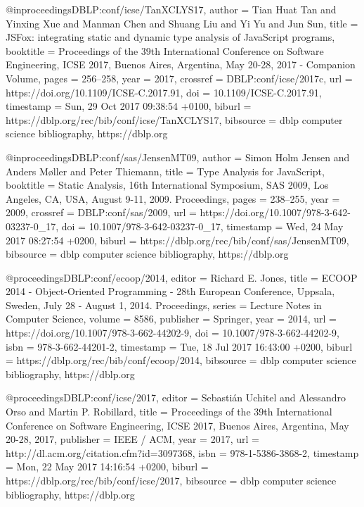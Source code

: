 @inproceedings{DBLP:conf/icse/TanXCLYS17,
  author    = {Tian Huat Tan and
               Yinxing Xue and
               Manman Chen and
               Shuang Liu and
               Yi Yu and
               Jun Sun},
  title     = {JSFox: integrating static and dynamic type analysis of JavaScript
               programs},
  booktitle = {Proceedings of the 39th International Conference on Software Engineering,
               {ICSE} 2017, Buenos Aires, Argentina, May 20-28, 2017 - Companion
               Volume},
  pages     = {256--258},
  year      = {2017},
  crossref  = {DBLP:conf/icse/2017c},
  url       = {https://doi.org/10.1109/ICSE-C.2017.91},
  doi       = {10.1109/ICSE-C.2017.91},
  timestamp = {Sun, 29 Oct 2017 09:38:54 +0100},
  biburl    = {https://dblp.org/rec/bib/conf/icse/TanXCLYS17},
  bibsource = {dblp computer science bibliography, https://dblp.org}
}



@inproceedings{DBLP:conf/sas/JensenMT09,
  author    = {Simon Holm Jensen and
               Anders M{\o}ller and
               Peter Thiemann},
  title     = {Type Analysis for JavaScript},
  booktitle = {Static Analysis, 16th International Symposium, {SAS} 2009, Los Angeles,
               CA, USA, August 9-11, 2009. Proceedings},
  pages     = {238--255},
  year      = {2009},
  crossref  = {DBLP:conf/sas/2009},
  url       = {https://doi.org/10.1007/978-3-642-03237-0_17},
  doi       = {10.1007/978-3-642-03237-0_17},
  timestamp = {Wed, 24 May 2017 08:27:54 +0200},
  biburl    = {https://dblp.org/rec/bib/conf/sas/JensenMT09},
  bibsource = {dblp computer science bibliography, https://dblp.org}
}

@proceedings{DBLP:conf/ecoop/2014,
  editor    = {Richard E. Jones},
  title     = {{ECOOP} 2014 - Object-Oriented Programming - 28th European Conference,
               Uppsala, Sweden, July 28 - August 1, 2014. Proceedings},
  series    = {Lecture Notes in Computer Science},
  volume    = {8586},
  publisher = {Springer},
  year      = {2014},
  url       = {https://doi.org/10.1007/978-3-662-44202-9},
  doi       = {10.1007/978-3-662-44202-9},
  isbn      = {978-3-662-44201-2},
  timestamp = {Tue, 18 Jul 2017 16:43:00 +0200},
  biburl    = {https://dblp.org/rec/bib/conf/ecoop/2014},
  bibsource = {dblp computer science bibliography, https://dblp.org}
}

@proceedings{DBLP:conf/icse/2017,
  editor    = {Sebasti{\'{a}}n Uchitel and
               Alessandro Orso and
               Martin P. Robillard},
  title     = {Proceedings of the 39th International Conference on Software Engineering,
               {ICSE} 2017, Buenos Aires, Argentina, May 20-28, 2017},
  publisher = {{IEEE} / {ACM}},
  year      = {2017},
  url       = {http://dl.acm.org/citation.cfm?id=3097368},
  isbn      = {978-1-5386-3868-2},
  timestamp = {Mon, 22 May 2017 14:16:54 +0200},
  biburl    = {https://dblp.org/rec/bib/conf/icse/2017},
  bibsource = {dblp computer science bibliography, https://dblp.org}
}

